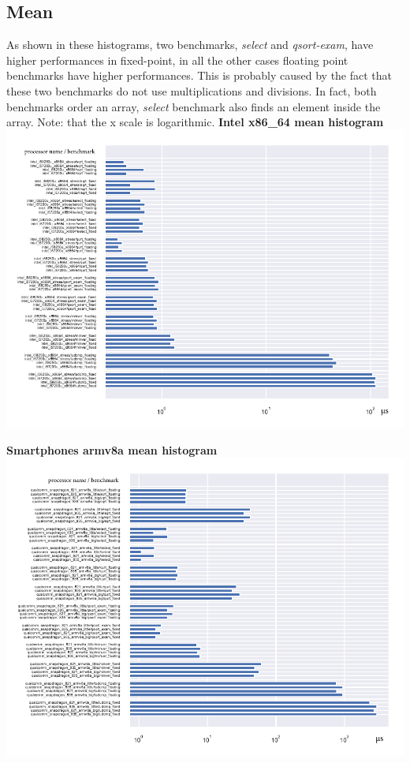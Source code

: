 \subsection{Mean}

As shown in these histograms, two benchmarks, \textit{select} and \textit{qsort-exam}, have higher performances in fixed-point, in all the other cases floating point benchmarks have higher performances. This is probably caused by the fact that these two benchmarks do not use multiplications and divisions. In fact, both benchmarks order an array, \textit{select} benchmark also finds an element inside the array.\newline
Note: that the x scale is logarithmic. \newline
\textbf{Intel x86\_64 mean histogram}\newline
\hspace*{-3.2cm}
\includegraphics[width=545pt]{intel_mean_histogram.pdf}
\clearpage

\textbf{Smartphones armv8a mean histogram}\newline
\hspace*{-3.2cm}
\includegraphics[width=570pt]{smartphones_mean_histogram.pdf}
\clearpage

